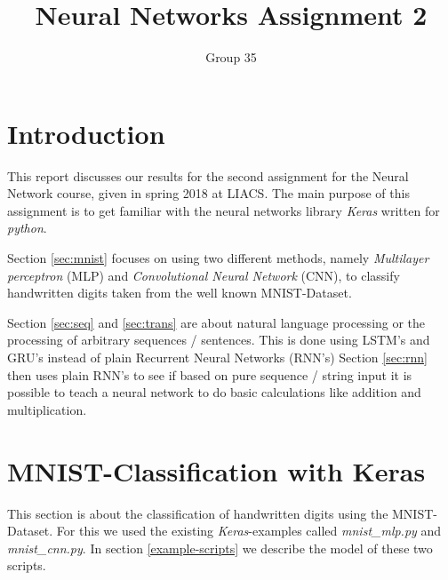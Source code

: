 \documentclass{article}[]
\begin{document}
\title{Neural Networks Assignment 2}
\author{Group 35}
\maketitle
\lstset{
  basicstyle=\ttfamily,
  keywordstyle=\bfseries,
  language=Java,
  frame=single,
  aboveskip=11pt,
  belowskip=11pt,
  breaklines=true,
  breakatwhitespace=false,
  showspaces=false,
  showstringspaces=false,
  numbers=left,
  stepnumber=1,    
  firstnumber=1,
  numberfirstline=true
}

\section{Introduction}
This report discusses our results for the second assignment for the Neural Network course, given in spring 2018 at LIACS.
The main purpose of this assignment is to get familiar with the neural networks library \textit{Keras}\cite{chollet2015keras} written for \textit{python}\cite{van2011python}.

Section \ref{sec:mnist} focuses on using two different methods, namely \emph{Multilayer perceptron} (MLP) and \emph{Convolutional Neural Network} (CNN), to classify handwritten digits taken from the well known MNIST-Dataset\cite{mnist}.

Section \ref{sec:seq} and \ref{sec:trans} are about natural language processing or the processing of arbitrary sequences / sentences. This is done using LSTM's and GRU's instead of plain Recurrent Neural Networks (RNN's)
Section \ref{sec:rnn} then uses plain RNN's to see if based on pure sequence / string input it is possible to teach a neural network to do basic calculations like addition and multiplication.

\section{MNIST-Classification with Keras}
\label{task-1}
\label{sec:mnist}
This section is about the classification of handwritten digits using the MNIST-Dataset.
For this we used the existing \textit{Keras}\cite{chollet2015keras}-examples called \textit{mnist\_mlp.py}\cite{kerasexamples} and \textit{mnist\_cnn.py}\cite{kerasexamples}.
In section \ref{example-scripts} we describe the model of these two scripts.
\end{document}
